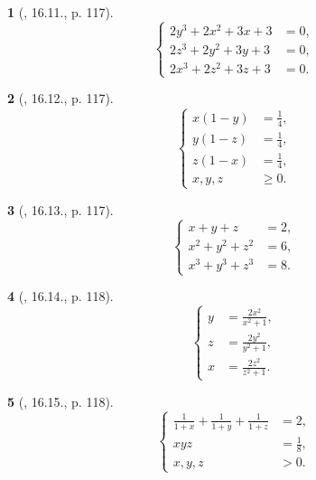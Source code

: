 \documentclass{article}
\newtheorem{baitoan}{}
\begin{document}
\begin{baitoan}[\cite{TLCT_THCS_Toan_9_dai_so}, 16.11., p. 117]
	\begin{equation*}
		\left\{\begin{split}
			2y^3 + 2x^2 + 3x + 3 &= 0,\\
			2z^3 + 2y^2 + 3y + 3 &= 0,\\
			2x^3 + 2z^2 + 3z + 3 &= 0.
		\end{split}\right.
	\end{equation*}
\end{baitoan}

\begin{baitoan}[\cite{TLCT_THCS_Toan_9_dai_so}, 16.12., p. 117]
	\begin{equation*}
		\left\{\begin{split}
			x(1 - y) &= \frac{1}{4},\\
			y(1 - z) &= \frac{1}{4},\\
			z(1 - x) &= \frac{1}{4},\\
			x,y,z&\ge0.
		\end{split}\right.
	\end{equation*}
\end{baitoan}

\begin{baitoan}[\cite{TLCT_THCS_Toan_9_dai_so}, 16.13., p. 117]
	\begin{equation*}
		\left\{\begin{split}
			x + y + z &= 2,\\
			x^2 + y^2 + z^2 &= 6,\\
			x^3 + y^3 + z^3 &= 8.
		\end{split}\right.
	\end{equation*}
\end{baitoan}

\begin{baitoan}[\cite{TLCT_THCS_Toan_9_dai_so}, 16.14., p. 118]
	\begin{equation*}
		\left\{\begin{split}
			y &= \frac{2x^2}{x^2 + 1},\\
			z &= \frac{2y^2}{y^2 + 1},\\
			x &= \frac{2z^2}{z^2 + 1}.
		\end{split}\right.
	\end{equation*}
\end{baitoan}

\begin{baitoan}[\cite{TLCT_THCS_Toan_9_dai_so}, 16.15., p. 118]
	\begin{equation*}
		\left\{\begin{split}
			\frac{1}{1 + x} + \frac{1}{1 + y} + \frac{1}{1 + z} &= 2,\\
			xyz &= \frac{1}{8},\\
			x,y,z &> 0.
		\end{split}\right.
	\end{equation*}
\end{baitoan}
\end{document}
